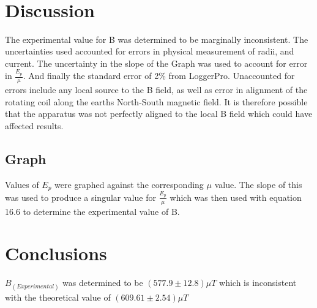 \documentclass{article}
\begin{document}
\ 

\ 

\ 

\ 


\ 

\ 

\section{Discussion}
The experimental value for B was determined to be marginally inconsistent. The uncertainties used accounted for errors in physical measurement of radii, and current. The uncertainty in the slope of the Graph was used to account for error in $\frac{E_p}{\mu}$. And finally the standard error of 2\% from LoggerPro. Unaccounted for errors include any local source to the B field, as well as error in alignment of the rotating coil along the earths North-South magnetic field. It is therefore possible that the apparatus was not perfectly aligned to the local B field which could have affected results.
\subsection{Graph}
Values of $E_p$ were graphed against the corresponding $\mu$ value. The slope of this was used to produce a singular value for $\frac{E_p}{\mu}$ which was then used with equation 16.6 to determine the experimental value of B.
\section{Conclusions}
$B_{(Experimental)}$ was determined to be $(577.9\pm12.8)\mu T$ which is inconsistent with the theoretical value of $(609.61\pm2.54)\mu T$
\end{document}
